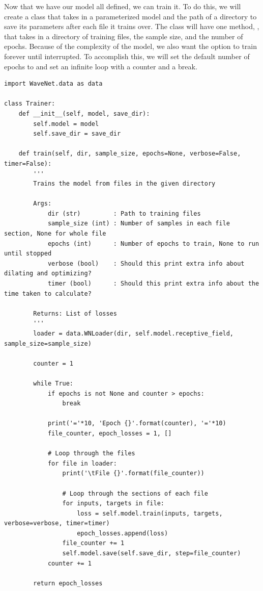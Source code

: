 
Now that we have our model all defined, we can train it. To do this, we will create a  class that takes in a parameterized model and the path of a directory to save its parameters after each file it trains over. The class will have one method, , that takes in a directory of training files, the sample size, and the number of epochs. Because of the complexity of the model, we also want the option to train forever until interrupted. To accomplish this, we will set the default number of epochs to  and set an infinite loop with a counter and a break.

\begin{verbatim}
import WaveNet.data as data

class Trainer:
    def __init__(self, model, save_dir):
        self.model = model
        self.save_dir = save_dir

    def train(self, dir, sample_size, epochs=None, verbose=False, timer=False):
        '''
        Trains the model from files in the given directory

        Args:
            dir (str)         : Path to training files
            sample_size (int) : Number of samples in each file section, None for whole file
            epochs (int)      : Number of epochs to train, None to run until stopped
            verbose (bool)    : Should this print extra info about dilating and optimizing?
            timer (bool)      : Should this print extra info about the time taken to calculate?

        Returns: List of losses
        '''
        loader = data.WNLoader(dir, self.model.receptive_field, sample_size=sample_size)

        counter = 1

        while True:
            if epochs is not None and counter > epochs:
                break

            print('='*10, 'Epoch {}'.format(counter), '='*10)
            file_counter, epoch_losses = 1, []

            # Loop through the files
            for file in loader:
                print('\tFile {}'.format(file_counter))

                # Loop through the sections of each file
                for inputs, targets in file:
                    loss = self.model.train(inputs, targets, verbose=verbose, timer=timer)
                    epoch_losses.append(loss)
                file_counter += 1
                self.model.save(self.save_dir, step=file_counter)
            counter += 1

        return epoch_losses
\end{verbatim}

